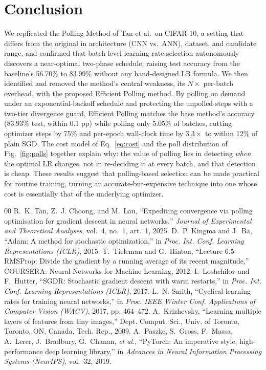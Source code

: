 \documentclass[conference]{IEEEtran}
\begin{document}
\section{Conclusion}

We replicated the Polling Method of Tan et al.\ on CIFAR-10, a setting that differs from the original in architecture (CNN vs.\ ANN), dataset, and candidate range, and confirmed that batch-level learning-rate selection autonomously discovers a near-optimal two-phase schedule, raising test accuracy from the baseline's 56.70\% to 83.99\% without any hand-designed LR formula. We then identified and removed the method's central weakness, its $N\times$ per-batch overhead, with the proposed Efficient Polling method. By polling on demand under an exponential-backoff schedule and protecting the unpolled steps with a two-tier divergence guard, Efficient Polling matches the base method's accuracy (83.93\% test, within 0.1 pp) while polling only 5.05\% of batches, cutting optimizer steps by 75\% and per-epoch wall-clock time by $3.3\times$ to within 12\% of plain SGD. The cost model of Eq.~\eqref{eq:cost} and the poll distribution of Fig.~\ref{fig:polls} together explain why: the value of polling lies in detecting \emph{when} the optimal LR changes, not in re-deciding it at every batch, and that detection is cheap. These results suggest that polling-based selection can be made practical for routine training, turning an accurate-but-expensive technique into one whose cost is essentially that of the underlying optimizer.

\begin{thebibliography}{00}
 R.~K. Tan, Z.~J. Choong, and M.~Lau, ``Expediting convergence via polling optimisation for gradient descent in neural networks,'' \emph{Journal of Experimental and Theoretical Analyses}, vol.~4, no.~1, art.~1, 2025.
 D.~P. Kingma and J.~Ba, ``Adam: A method for stochastic optimization,'' in \emph{Proc. Int. Conf. Learning Representations (ICLR)}, 2015.
 T.~Tieleman and G.~Hinton, ``Lecture 6.5---RMSProp: Divide the gradient by a running average of its recent magnitude,'' COURSERA: Neural Networks for Machine Learning, 2012.
 I.~Loshchilov and F.~Hutter, ``SGDR: Stochastic gradient descent with warm restarts,'' in \emph{Proc. Int. Conf. Learning Representations (ICLR)}, 2017.
 L.~N. Smith, ``Cyclical learning rates for training neural networks,'' in \emph{Proc. IEEE Winter Conf. Applications of Computer Vision (WACV)}, 2017, pp. 464--472.
 A.~Krizhevsky, ``Learning multiple layers of features from tiny images,'' Dept. Comput. Sci., Univ. of Toronto, Toronto, ON, Canada, Tech. Rep., 2009.
 A.~Paszke, S.~Gross, F.~Massa, A.~Lerer, J.~Bradbury, G.~Chanan, \emph{et al.}, ``PyTorch: An imperative style, high-performance deep learning library,'' in \emph{Advances in Neural Information Processing Systems (NeurIPS)}, vol.~32, 2019.
\end{thebibliography}
\end{document}
